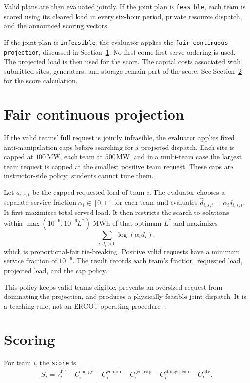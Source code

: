 \documentclass[12pt]{article}
\newcommand{\code}[1]{\texttt{#1}}
\newcommand{\MW}{\,\mathrm{MW}}
\begin{document}
Valid plans are then evaluated jointly. If the joint plan is \code{feasible}, each
team is scored using its cleared load in every six-hour period, private resource dispatch, and
the announced scoring vectors.

If the joint plan is \code{infeasible}, the evaluator applies the \code{fair
continuous projection}, discussed in Section~\ref{sec:projection}. No first-come-first-serve ordering is used. The projected
load is then used for the score. The capital costs associated with submitted
sites, generators, and storage remain part of the score. See Section~\ref{sec:score} for the score calculation.

\section{Fair continuous projection}\label{sec:projection}

If the valid teams' full request is jointly infeasible, the evaluator applies
fixed anti-manipulation caps before searching for a projected dispatch. Each
site is capped at $100\MW$, each team at $500\MW$, and in a multi-team case the
largest team request is capped at the smallest positive team request. These
caps are instructor-side policy; students cannot tune them.

Let $d_{i,s,t}$ be the capped requested load of team $i$. The evaluator chooses
a separate service fraction $\alpha_i\in[0,1]$ for each team and evaluates
$\widehat d_{i,s,t}=\alpha_i d_{i,s,t}$. It first maximizes total served load.
It then restricts the search to solutions within
$\max(10^{-6},10^{-6}L^*)$ MWh of that optimum $L^*$ and maximizes
\[
  \sum_{i:d_i>0}\log(\alpha_i d_i),
\]
which is proportional-fair tie-breaking. Positive valid requests have a
minimum service fraction of $10^{-6}$. The result records each team's fraction,
requested load, projected load, and the cap policy.

This policy keeps valid teams eligible, prevents an oversized request from
dominating the projection, and produces a physically feasible joint dispatch.
It is a teaching rule, not an ERCOT operating procedure~\cite{kelly1998charging,
jacubowicz2022fairness,gebbran2021fairder}.

\section{Scoring}\label{sec:score}

For team $i$, the \code{score} is
\[
\begin{aligned}
S_i={}V_i^{\mathrm{IT}}-C_i^{\mathrm{energy}}
-C_i^{\mathrm{gen,op}}-C_i^{\mathrm{gen,cap}}-C_i^{\mathrm{storage,cap}}
-C_i^{\mathrm{site}}.
\end{aligned}
\]
\end{document}

